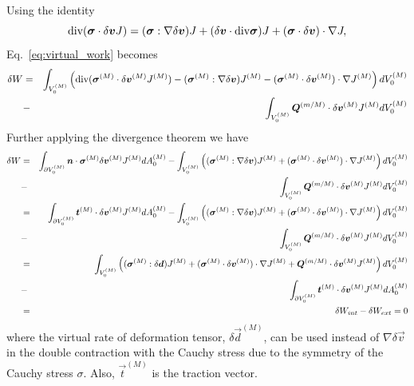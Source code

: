 Using the identity
%
\begin{equation}
\text{div}(\bm{\sigma}\cdot\delta\bm{v} J) =  (\bm{\sigma}:\nabla\delta\bm{v})J + (\delta \bm{v} \cdot \text{div}\bm{\sigma})J + (\bm{\sigma} \cdot \delta\bm{v})\cdot \nabla J,
\end{equation}
%
Eq.\ \eqref{eq:virtual_work} becomes
%
\begin{eqnarray}
\delta W &=& \int_{V_0^{(M)}} \left(\text{div}(\mat{\sigma}^{(M)} \cdot \delta\vec{v}^{(M)} J^{(M)}) - (\mat{\sigma}^{(M)}:\nabla \delta \vec{v}) J^{(M)} - (\mat{\sigma}^{(M)}\cdot \delta \vec{v}^{(M)})\cdot \nabla J^{(M)} \right)dV_0^{(M)} \nonumber\\
%
&-& \int_{V_0^{(M)}} \vec{Q}^{(m/M)} \cdot \delta \vec{v}^{(M)}J^{(M)} dV_0^{(M)} 
%
\end{eqnarray}
%
Further applying the divergence theorem we have
%
\begin{eqnarray}
\delta W &=& \int_{\partial V_0^{(M)}} \vec{n} \cdot \mat{\sigma}^{(M)} \delta\vec{v}^{(M)} J^{(M)} dA_0^{(M)} - \int_{V_0^{(M)}} \left((\mat{\sigma}^{(M)}:\nabla \delta \vec{v}) J^{(M)} + (\mat{\sigma}^{(M)} \cdot \delta \vec{v}^{(M)})\cdot \nabla J^{(M)} \right)dV_0^{(M)} \nonumber\\
%
&-& \int_{V_0^{(M)}} \vec{Q}^{(m/M)} \cdot \delta \vec{v}^{(M)}J^{(M)} dV_0^{(M)} \nonumber\\
%
&=& \int_{\partial V_0^{(M)}} \vec{t}^{(M)} \cdot \delta\vec{v}^{(M)} J^{(M)} dA_0^{(M)} - \int_{V_0^{(M)}} \left((\mat{\sigma}^{(M)}:\nabla \delta \vec{v}) J^{(M)} + (\mat{\sigma}^{(M)} \cdot \delta \vec{v}^{(M)})\cdot \nabla J^{(M)} \right)dV_0^{(M)} \nonumber\\
%
&-& \int_{V_0^{(M)}} \vec{Q}^{(m/M)} \cdot \delta \vec{v}^{(M)}J^{(M)} dV_0^{(M)} \nonumber\\
&=& \int_{V_0^{(M)}} \left((\mat{\sigma}^{(M)}:\delta \vec{d}) J^{(M)} + (\mat{\sigma}^{(M)}\cdot\delta \vec{v}^{(M)})\cdot \nabla J^{(M)} +\vec{Q}^{(m/M)} \cdot \delta \vec{v}^{(M)}J^{(M)}\right)dV_0^{(M)} \nonumber\\
%
&-& \int_{\partial V_0^{(M)}} \vec{t}^{(M)} \cdot \delta\vec{v}^{(M)} J^{(M)} dA_0^{(M)} \nonumber\\
%
&=& \delta W_{int} - \delta W_{ext} = 0
\label{eq:virtual_work_final}
\end{eqnarray}
%
where the virtual rate of deformation tensor, $\delta \vec{d}^{(M)}$, can be used instead of $\nabla \delta \vec{v}$ in the double contraction with the Cauchy stress due to the symmetry of the Cauchy stress $\sigma$. Also, $\vec{t}^{(M)}$ is the traction vector.

